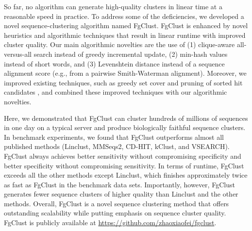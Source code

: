 \documentclass[11pt,letterpaper]{article}
\begin{document}
So far, no algorithm can generate high-quality clusters in linear time at a reasonable speed in practice.
To address some of the deficiencies,  we developed a novel sequence-clustering algorithm named FgClust.
FgClust is enhanced by novel heuristics and algorithmic techniques that result in linear runtime with improved cluster quality.
Our main algorithmic novelties are the use of (1) clique-aware all-versus-all search instead of greedy incremental update, (2) min-hash values instead of short words, and (3) Levenshtein distance instead of a sequence alignment score (e.g., from a pairwise Smith-Waterman alignment). Moreover, we improved existing techniques, such as greedy set cover \cite{steinegger2017mmseqs2} and pruning of sorted hit candidates \cite{edgar2010search}, and combined these improved techniques with our algorithmic novelties.

%

Here, we demonstrated that FgClust can cluster hundreds of millions of sequences in one day on a typical server and produce biologically faithful sequence clusters. In benchmark experiments, we found that FgClust outperforms almost all published methods (Linclust, MMSeqs2, CD-HIT, kClust, and VSEARCH). FgClust always achieves better sensitivity without compromising specificity and better specificity without compromising sensitivity. In terms of runtime, FgClust exceeds all the other methods except Linclust, which finishes approximately twice as fast as FgClust in the benchmark data sets. Importantly, however, FgClust generates fewer sequence clusters of higher quality than Linclust and the other methods. Overall, FgClust is a novel sequence clustering method that offers outstanding scalability while putting emphasis on sequence cluster quality. FgClust is publicly available at \url{https://github.com/zhaoxiaofei/fgclust}.
\end{document}
